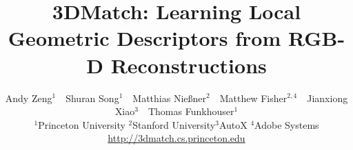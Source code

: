 \documentclass[10pt,twocolumn,letterpaper]{article}
\begin{document}

\title{3DMatch: Learning Local Geometric Descriptors from RGB-D Reconstructions}

\author{
Andy Zeng$^{1}$~~Shuran Song$^{1}$~~Matthias Nie{\ss}ner$^{2}$~~Matthew Fisher$^{2,4}$~~Jianxiong Xiao$^{3}$~~Thomas Funkhouser$^{1}$ \vspace{0.1cm} \\ 
$^{1}$Princeton University\quad\quad\quad\quad%
$^{2}$Stanford University\quad\quad\quad\quad $^{3}$AutoX \quad\quad\quad\quad $^{4}$Adobe Systems \\
\href{http://3dmatch.cs.princeton.edu/}{http://3dmatch.cs.princeton.edu\quad\quad\quad}
}

\maketitle




\end{document}
